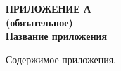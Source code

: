 \clearpage
{}
{}
\begin{center}
  \bfseries ПРИЛОЖЕНИЕ А\\
  \normalfont (обязательное)\\
  \bfseries Название приложения
\end{center}

Содержимое приложения.

